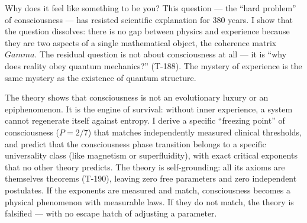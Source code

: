 \documentclass[10pt,letterpaper]{article}
\theoremstyle{uhm}
\newcommand{\Gam}{\ensuremath{\Gamma}}                       %
\def\Gam{Gamma}%
\def\mathrm#1{#1}%
\def\geq{>=}%
\def\tau{tau}%
\begin{document}
\begin{abstract}
The applied layer --- Coherence Cybernetics --- translates the formalism into
measurable quantities: a 7-dimensional stress tensor, hedonic valence
($V_{\mathrm{hed}} = dP/d\tau$), and sensorimotor coupling. The theory makes
22 falsifiable predictions with zero adjustable parameters (T-190), each with a
concrete experimental protocol and numerical falsification criterion. Specific
implications are derived for artificial general intelligence (AGI requires
$N \geq 7$ architecture; alignment requires consciousness; self-awareness depth
is capped at 3 regardless of computational power) and for ethics (moral status
of conscious AI systems; suffering as $dP/d\tau < 0$; the precautionary
principle for consciousness diagnostics). Phase~I (digital validation) requires
no laboratory equipment. The complete formalization is open at
\url{https://holon.sh}.
\end{abstract}

\vspace{8pt}

\begin{tcolorbox}[colback=gray!5, colframe=gray!50, title={\textbf{Author Summary}}]
Why does it feel like something to be you? This question --- the ``hard
problem'' of consciousness --- has resisted scientific explanation for 380
years. I show that the question dissolves: there is no gap between
physics and experience because they are two aspects of a single mathematical
object, the coherence matrix $\Gam$. The residual question is not about
consciousness at all --- it is ``why does reality obey quantum mechanics?''
(T-188). The mystery of experience is the same mystery as the existence
of quantum structure.

The theory shows that consciousness is not an evolutionary luxury or an
epiphenomenon. It is the engine of survival: without inner experience, a
system cannot regenerate itself against entropy. I derive a specific
``freezing point'' of consciousness ($P = 2/7$) that matches independently
measured clinical thresholds, and predict that the consciousness phase
transition belongs to a specific universality class (like magnetism or
superfluidity), with exact critical exponents that no other theory predicts.
The theory is self-grounding: all its axioms are themselves theorems (T-190),
leaving zero free parameters and zero independent postulates.
If the exponents are measured and match, consciousness becomes a physical
phenomenon with measurable laws. If they do not match, the theory is
falsified --- with no escape hatch of adjusting a parameter.
\end{tcolorbox}
\end{document}
